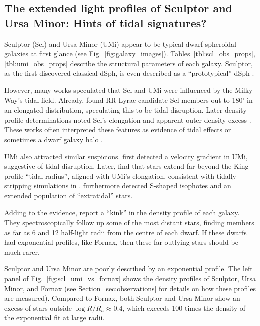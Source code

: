 \subsection{The extended light profiles of Sculptor and Ursa Minor:
Hints of tidal signatures?}\label{sec:scl_umi_obs_tides}

Sculptor (Scl) and Ursa Minor (UMi) appear to be typical dwarf
spheroidal galaxies at first glance (see Fig.~\ref{fig:galaxy_images}).
Tables~\ref{tbl:scl_obs_props}, \ref{tbl:umi_obs_props} describe the
structural parameters of each galaxy. Sculptor, as the first discovered
classical dSph, is even described as a ``prototypical'' dSph
\citep[e.g.,][]{mcconnachie2012}.

However, many works speculated that Scl and UMi were influenced by the
Milky Way's tidal field. Already, \citet{innanen+papp1979} found RR
Lyrae candidate Scl members \citep[from][]{vanagt1978} out to 180' in an
elongated distribution, speculating this to be tidal disruption. Later
density profile determinations noted Scl's elongation and apparent outer
density excess
\citetext{\citealp{eskridge1988}; \citealp{IH1995}; \citealp{walcher+2003}; \citealp{westfall+2006}; \citealp[but
see also][]{coleman+dacosta+bland-hawthorn2005}}. These works often
interpreted these features as evidence of tidal effects
\citep[e.g.,][]{walcher+2003} or sometimes a dwarf galaxy halo
\citep{westfall+2006}.

UMi also attracted similar suspicions. \citet{hargreaves+1994} first
detected a velocity gradient in UMi, suggestive of tidal disruption.
Later, \citet{martinez-delgado+2001} find that stars extend far beyond
the King-profile ``tidal radius'', aligned with UMi's elongation,
consistent with tidally-stripping simulations in
\citet{gomez-flechoso+martinez-delgado2003}. \citet{palma+2003}
furthermore detected S-shaped isophotes and an extended population of
``extratidal'' stars.

Adding to the evidence, \citet{sestito+2023a, sestito+2023b} report a
``kink'' in the density profile of each galaxy. They spectroscopically
follow up some of the most distant stars, finding members as far as 6
and 12 half-light radii from the centre of each dwarf. If these dwarfs
had exponential profiles, like Fornax, then these far-outlying stars
should be much rarer.

Sculptor and Ursa Minor are poorly described by an exponential profile.
The left panel of Fig.~\ref{fig:scl_umi_vs_fornax} shows the density
profiles of Sculptor, Ursa Minor, and Fornax (see
Section~\ref{sec:observations} for details on how these profiles are
measured). Compared to Fornax, both Sculptor and Ursa Minor show an
excess of stars outside \(\log R/R_h\approx 0.4\), which exceeds 100
times the density of the exponential fit at large radii.

